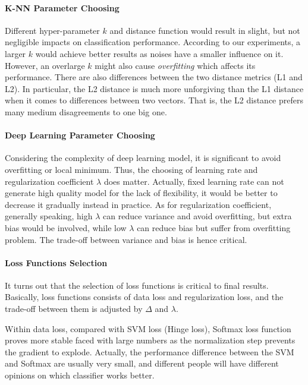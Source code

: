 \documentclass[10pt,twocolumn,letterpaper]{article}
\begin{document}
	\paragraph{K-NN Parameter Choosing} Different hyper-parameter $k$ and distance function would result in slight, but not negligible impacts on classification performance. According to our experiments, a larger $k$ would achieve better results as noises have a smaller influence on it. However, an overlarge $k$ might also cause \emph{overfitting} which affects its performance. There are also differences between the two distance metrics (L1 and L2). In particular, the L2 distance is much more unforgiving than the L1 distance when it comes to differences between two vectors. That is, the L2 distance prefers many medium disagreements to one big one.
	
	\paragraph{Deep Learning Parameter Choosing} Considering the complexity of deep learning model, it is significant to avoid overfitting or local minimum. Thus, the choosing of learning rate and regularization coefficient $\lambda$ does matter. Actually, fixed learning rate can not generate high quality model for the lack of flexibility, it would be better to decrease it gradually instead in practice. As for regularization coefficient, generally speaking, high $\lambda$ can reduce variance and avoid overfitting, but extra bias would be involved, while low $\lambda$ can reduce bias but suffer from overfitting problem. The trade-off between variance and bias is hence critical.
	
	\paragraph{Loss Functions Selection} It turns out that the selection of loss functions is critical to final results. Basically, loss functions consists of data loss and regularization loss, and the trade-off between them is adjusted by $\Delta$ and $\lambda$.
	
	Within data loss, compared with SVM loss (Hinge loss), Softmax loss function proves more stable faced with large numbers as the normalization step prevents the gradient to explode. Actually, the performance difference between the SVM and Softmax are usually very small, and different people will have different opinions on which classifier works better.
	
\end{document}

